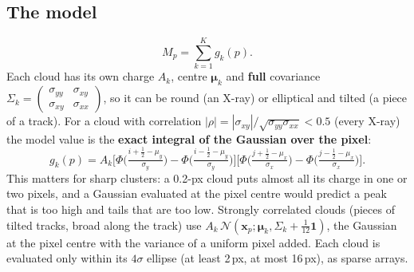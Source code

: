 \documentclass[11pt,a4paper]{article}
\newcommand{\N}{\mathcal{N}}
\begin{document}
\subsection{The model}
\begin{equation}
M_p=\sum_{k=1}^{K}g_k(p).
\end{equation}
Each cloud has its own charge $A_k$, centre $\bm\mu_k$ and \textbf{full} covariance
$\Sigma_k=\begin{pmatrix}\sigma_{yy}&\sigma_{xy}\\ \sigma_{xy}&\sigma_{xx}\end{pmatrix}$, so it can be round (an X-ray) or
elliptical and tilted (a piece of a track). For a cloud with correlation $|\rho|=|\sigma_{xy}|/\sqrt{\sigma_{yy}\sigma_{xx}}<0.5$
(every X-ray) the model value is the \textbf{exact integral of the Gaussian over the pixel}:
\begin{equation}
g_k(p)=A_k\Big[\Phi\big(\tfrac{i+\frac12-\mu_{y}}{\sigma_{y}}\big)-\Phi\big(\tfrac{i-\frac12-\mu_{y}}{\sigma_{y}}\big)\Big]
\Big[\Phi\big(\tfrac{j+\frac12-\mu_{x}}{\sigma_{x}}\big)-\Phi\big(\tfrac{j-\frac12-\mu_{x}}{\sigma_{x}}\big)\Big].
\end{equation}
This matters for sharp clusters: a 0.2-px cloud puts almost all its charge in one or two pixels, and a Gaussian evaluated at
the pixel centre would predict a peak that is too high and tails that are too low. Strongly correlated clouds (pieces of tilted
tracks, broad along the track) use $A_k\,\N(\mathbf x_p;\bm\mu_k,\Sigma_k+\tfrac1{12}\mathbf 1)$, the Gaussian at the pixel centre
with the variance of a uniform pixel added. Each cloud is evaluated only within its $4\sigma$ ellipse (at least 2\,px, at most
16\,px), as sparse arrays.
\end{document}
